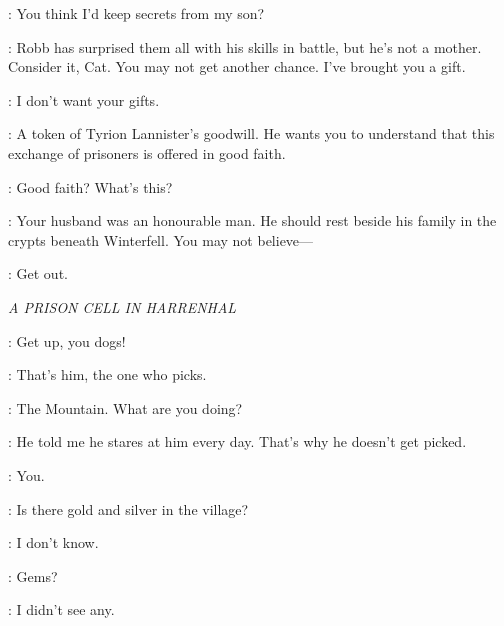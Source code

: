 \CATELYN: You think I'd keep secrets from my son? 

\LITTLEFINGER: Robb has surprised them all with his skills in battle, but he's not a mother. Consider it, Cat. You may not get another chance. I've brought you a gift. 

\CATELYN: I don't want your gifts. 

\LITTLEFINGER: A token of Tyrion Lannister's goodwill. He wants you to
understand that this exchange of prisoners is offered in good
faith. 

\CATELYN: Good faith? What's this? 


\LITTLEFINGER: Your husband was an honourable man. He should rest beside his family in the crypts beneath Winterfell. You may not believe--- 

\CATELYN: Get out. 



\scene

\textit{A PRISON CELL IN HARRENHAL} 


\POLLIVER: Get up, you dogs! 


\HOTPIE: That's him, the one who picks. 


\ARYA: The Mountain. What are you doing? 


\HOTPIE: He told me he stares at him every day. That's why he doesn't get picked. 

\MOUNTAIN:  You. 



\TICKLER: Is there gold and silver in the village? 

\PRISONER: I don't know. 

\TICKLER: Gems? 

\PRISONER: I didn't see any. 

